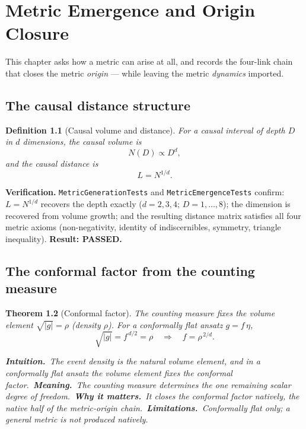 \documentclass[10pt,twoside,openany]{book}
\newtheorem{theorem}{Theorem}[chapter]
\newtheorem{definition}[theorem]{Definition}
\newcommand{\eqnotes}[4]{%
  \par\smallskip\noindent
  \textbf{Intuition.}\ #1\ 
  \textbf{Meaning.}\ #2\ 
  \textbf{Why it matters.}\ #3\ 
  \textbf{Limitations.}\ #4\par}
\begin{document}
\chapter{Metric Emergence and Origin Closure}
\label{ch:metric-emergence}

This chapter asks how a metric can arise at all, and records the four-link chain that
closes the metric \emph{origin} --- while leaving the metric \emph{dynamics} imported.

\section{The causal distance structure}

\begin{definition}[Causal volume and distance]
For a causal interval of depth $D$ in $d$ dimensions, the causal volume is
\begin{equation}
N(D) \propto D^d,
\end{equation}
and the causal distance is
\begin{equation}
L = N^{1/d}.
\end{equation}
\end{definition}

\textbf{Verification.} \texttt{MetricGenerationTests} and \texttt{MetricEmergenceTests}
confirm: $L=N^{1/d}$ recovers the depth exactly ($d=2,3,4$; $D=1,\dots,8$); the dimension
is recovered from volume growth; and the resulting distance matrix satisfies all four
metric axioms (non-negativity, identity of indiscernibles, symmetry, triangle inequality).
\textbf{Result: PASSED.}

\section{The conformal factor from the counting measure}

\begin{theorem}[Conformal factor]
The counting measure fixes the volume element $\sqrt{|g|}=\rho$ (density $\rho$). For a
conformally flat ansatz $g=f\,\eta$,
\begin{equation}
\sqrt{|g|} = f^{\,d/2} = \rho \quad\Longrightarrow\quad f = \rho^{\,2/d}.
\end{equation}

\eqnotes
{The event density is the natural volume element, and in a conformally flat ansatz the
volume element fixes the conformal factor.}
{The counting measure determines the one remaining scalar degree of freedom.}
{It closes the conformal \emph{factor} natively, the native half of the metric-origin
chain.}
{Conformally flat only; a general metric is not produced natively.}
\end{theorem}
\end{document}
